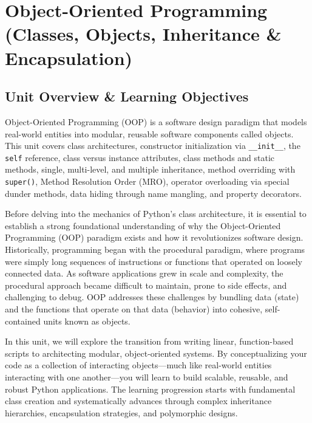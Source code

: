 \chapter{Object-Oriented Programming (Classes, Objects, Inheritance \& Encapsulation)}
\label{chap:object-oriented-programming}

\section{Unit Overview \& Learning Objectives}

\begin{conceptbox}
Object-Oriented Programming (OOP) is a software design paradigm that models real-world entities into modular, reusable software components called objects. This unit covers class architectures, constructor initialization via \texttt{\_\_init\_\_}, the \texttt{self} reference, class versus instance attributes, class methods and static methods, single, multi-level, and multiple inheritance, method overriding with \texttt{super()}, Method Resolution Order (MRO), operator overloading via special dunder methods, data hiding through name mangling, and property decorators.
\end{conceptbox}

Before delving into the mechanics of Python's class architecture, it is essential to establish a strong foundational understanding of why the Object-Oriented Programming (OOP) paradigm exists and how it revolutionizes software design. Historically, programming began with the procedural paradigm, where programs were simply long sequences of instructions or functions that operated on loosely connected data. As software applications grew in scale and complexity, the procedural approach became difficult to maintain, prone to side effects, and challenging to debug. OOP addresses these challenges by bundling data (state) and the functions that operate on that data (behavior) into cohesive, self-contained units known as objects. 

In this unit, we will explore the transition from writing linear, function-based scripts to architecting modular, object-oriented systems. By conceptualizing your code as a collection of interacting objects---much like real-world entities interacting with one another---you will learn to build scalable, reusable, and robust Python applications. The learning progression starts with fundamental class creation and systematically advances through complex inheritance hierarchies, encapsulation strategies, and polymorphic designs.

